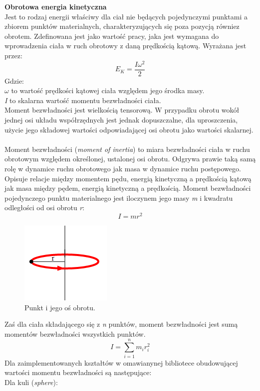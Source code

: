 \textbf{Obrotowa energia kinetyczna}\\
Jest to rodzaj energii właściwy dla ciał nie będących pojedynczymi punktami a
zbiorem punktów materialnych, charakteryzujących się poza pozycją równiez
obrotem. Zdefinowana jest jako wartość pracy, jaka jest wymagana do wprowadzenia
ciała w ruch obrotowy z daną prędkością kątową. Wyrażana jest przez:
\begin{equation}
E_{K} = \frac{I\omega^{2}}{2}
\end{equation}
Gdzie:\\
$ \omega $ to wartość prędkości kątowej ciała względem jego środka masy.\\
\emph{I} to skalarna wartość momentu bezwładności ciała.\\ Moment bezwładności
jest wielkością tensorową. W przypadku obrotu wokół jednej osi układu
współrzędnych jest jednak dopuszczalne, dla uproszczenia, użycie jego
składowej wartości odpowiadającej osi obrotu jako wartości skalarnej.\\
\\
\newpage
Moment bezwładności (\emph{moment of inertia}) to miara bezwładności ciała
w ruchu obrotowym względem określonej, ustalonej osi obrotu. Odgrywa prawie taką samą
rolę w dynamice ruchu obrotowego jak masa w dynamice ruchu postępowego. Opisuje
relacje między momentem pędu, energią kinetyczną a prędkością kątową jak masa
między pędem, energią kinetyczną a prędkością. Moment bezwładności pojedynczego
punktu materialnego jest iloczynem jego masy \emph{m} i kwadratu odległości od
osi obrotu \emph{r}:
\begin{equation}
I = mr^{2}
\end{equation}

\begin{figure}[h]
\centering
\includegraphics{./img/inertia.png}
\caption{Punkt i jego oś obrotu.}
\label{fig:inertia}
\end{figure}

Zaś dla ciała składającego się z \emph{n} punktów, moment bezwładności jest sumą
momentów bezwładności wszystkich punktów.
\begin{equation}
I = \sum_{i=1}^{n} m_{i}r_{i}^{2}
\end{equation}
Dla zaimplementowanych kształtów w omawianynej bibliotece obudowującej wartości
momentu bezwładności są następujące:\\
Dla kuli (\emph{sphere}):\\

